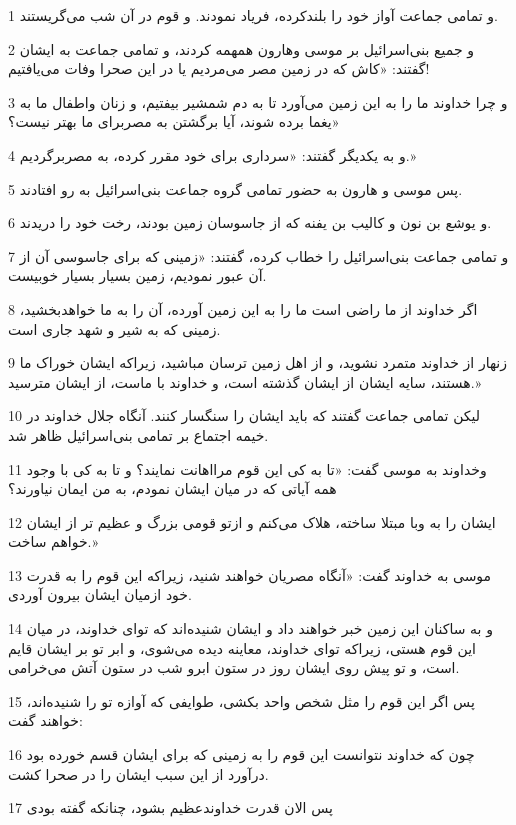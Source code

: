 \par 1 و تمامی جماعت آواز خود را بلندکرده، فریاد نمودند. و قوم در آن شب می‌گریستند.
\par 2 و جمیع بنی‌اسرائیل بر موسی وهارون همهمه کردند، و تمامی جماعت به ایشان گفتند: «کاش که در زمین مصر می‌مردیم یا در این صحرا وفات می‌یافتیم!
\par 3 و چرا خداوند ما را به این زمین می‌آورد تا به دم شمشیر بیفتیم، و زنان واطفال ما به یغما برده شوند، آیا برگشتن به مصربرای ما بهتر نیست؟»
\par 4 و به یکدیگر گفتند: «سرداری برای خود مقرر کرده، به مصربرگردیم.»
\par 5 پس موسی و هارون به حضور تمامی گروه جماعت بنی‌اسرائیل به رو افتادند.
\par 6 و یوشع بن نون و کالیب بن یفنه که از جاسوسان زمین بودند، رخت خود را دریدند.
\par 7 و تمامی جماعت بنی‌اسرائیل را خطاب کرده، گفتند: «زمینی که برای جاسوسی آن از آن عبور نمودیم، زمین بسیار بسیار خوبیست.
\par 8 اگر خداوند از ما راضی است ما را به این زمین آورده، آن را به ما خواهدبخشید، زمینی که به شیر و شهد جاری است.
\par 9 زنهار از خداوند متمرد نشوید، و از اهل زمین ترسان مباشید، زیراکه ایشان خوراک ما هستند، سایه ایشان از ایشان گذشته است، و خداوند با ماست، از ایشان مترسید.»
\par 10 لیکن تمامی جماعت گفتند که باید ایشان را سنگسار کنند. آنگاه جلال خداوند در خیمه اجتماع بر تمامی بنی‌اسرائیل ظاهر شد.
\par 11 وخداوند به موسی گفت: «تا به کی این قوم مرااهانت نمایند؟ و تا به کی با وجود همه آیاتی که در میان ایشان نمودم، به من ایمان نیاورند؟
\par 12 ایشان را به وبا مبتلا ساخته، هلاک می‌کنم و ازتو قومی بزرگ و عظیم تر از ایشان خواهم ساخت.»
\par 13 موسی به خداوند گفت: «آنگاه مصریان خواهند شنید، زیراکه این قوم را به قدرت خود ازمیان ایشان بیرون آوردی.
\par 14 و به ساکنان این زمین خبر خواهند داد و ایشان شنیده‌اند که تو‌ای خداوند، در میان این قوم هستی، زیراکه تو‌ای خداوند، معاینه دیده می‌شوی، و ابر تو بر ایشان قایم است، و تو پیش روی ایشان روز در ستون ابرو شب در ستون آتش می‌خرامی.
\par 15 پس اگر این قوم را مثل شخص واحد بکشی، طوایفی که آوازه تو را شنیده‌اند، خواهند گفت:
\par 16 چون که خداوند نتوانست این قوم را به زمینی که برای ایشان قسم خورده بود درآورد از این سبب ایشان را در صحرا کشت.
\par 17 پس الان قدرت خداوندعظیم بشود، چنانکه گفته بودی
